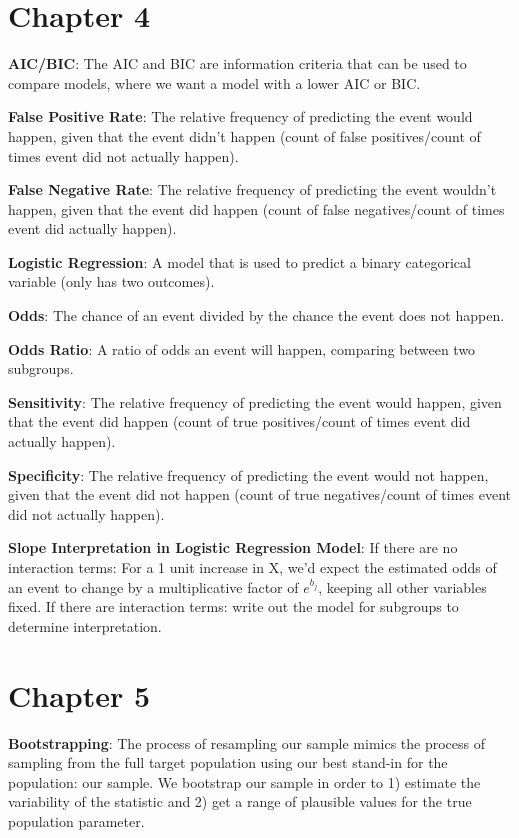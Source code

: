 \documentclass[
]{book}
\begin{document}
\hypertarget{chapter-4}{%
\section{Chapter 4}\label{chapter-4}}

\textbf{AIC/BIC}: The AIC and BIC are information criteria that can be used to compare models, where we want a model with a lower AIC or BIC.

\textbf{False Positive Rate}: The relative frequency of predicting the event would happen, given that the event didn't happen (count of false positives/count of times event did not actually happen).

\textbf{False Negative Rate}: The relative frequency of predicting the event wouldn't happen, given that the event did happen (count of false negatives/count of times event did actually happen).

\textbf{Logistic Regression}: A model that is used to predict a binary categorical variable (only has two outcomes).

\textbf{Odds}: The chance of an event divided by the chance the event does not happen.

\textbf{Odds Ratio}: A ratio of odds an event will happen, comparing between two subgroups.

\textbf{Sensitivity}: The relative frequency of predicting the event would happen, given that the event did happen (count of true positives/count of times event did actually happen).

\textbf{Specificity}: The relative frequency of predicting the event would not happen, given that the event did not happen (count of true negatives/count of times event did not actually happen).

\textbf{Slope Interpretation in Logistic Regression Model}: If there are no interaction terms: For a 1 unit increase in X, we'd expect the estimated odds of an event to change by a multiplicative factor of \(e^{b_j}\), keeping all other variables fixed. If there are interaction terms: write out the model for subgroups to determine interpretation.

\hypertarget{chapter-5}{%
\section{Chapter 5}\label{chapter-5}}

\textbf{Bootstrapping}: The process of resampling our sample mimics the process of sampling from the full target population using our best stand-in for the population: our sample. We bootstrap our sample in order to 1) estimate the variability of the statistic and 2) get a range of plausible values for the true population parameter.
\end{document}
